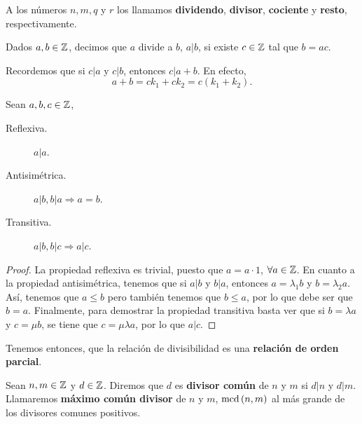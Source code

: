 \begin{observation}
A los números $\displaystyle n, m, q $ y $\displaystyle r $ los llamamos \textbf{dividendo}, \textbf{divisor}, \textbf{cociente} y \textbf{resto}, respectivamente.
\end{observation}
\begin{definition}
Dados $\displaystyle a,b \in \mathbb{Z} $, decimos que $\displaystyle a $ divide a $\displaystyle b $, $\displaystyle a | b $, si existe $\displaystyle c \in \mathbb{Z} $ tal que $\displaystyle b = ac $.
\end{definition}
Recordemos que si $\displaystyle c | a $ y $\displaystyle c | b $, entonces $\displaystyle c | a+b $. En efecto, 
\[a + b = ck_{1} + ck_{2} = c\left(k_{1}+k_{2}\right) .\]
\begin{prop}
	Sean $\displaystyle a,b,c \in \mathbb{Z} $,
\begin{description}
\item[Reflexiva.] $\displaystyle a|a $.
\item[Antisimétrica.] $\displaystyle a|b, b|a \Rightarrow a = b $.
\item[Transitiva.] $\displaystyle a|b, b|c \Rightarrow a|c $.
\end{description}
\end{prop}
\begin{proof}
La propiedad reflexiva es trivial, puesto que $\displaystyle a = a \cdot 1 $, $\displaystyle \forall a \in \mathbb{Z} $. En cuanto a la propiedad antisimétrica, tenemos que si $\displaystyle a|b $ y $\displaystyle b|a $, entonces $\displaystyle a = \lambda_{1} b $ y $\displaystyle b = \lambda_{2}a $. Así, tenemos que $\displaystyle a \leq b $ pero también tenemos que $\displaystyle b \leq a $, por lo que debe ser que $\displaystyle b = a $. Finalmente, para demostrar la propiedad transitiva basta ver que si $\displaystyle b = \lambda a $ y $\displaystyle c = \mu b $, se tiene que $\displaystyle c = \mu \lambda a $, por lo que $\displaystyle a | c $.
\end{proof}
\begin{observation}
Tenemos entonces, que la relación de divisibilidad es una \textbf{relación de orden parcial}.
\end{observation}
\begin{definition}
Sean $\displaystyle n, m \in \mathbb{Z} $ y $\displaystyle d \in \mathbb{Z} $. Diremos que $\displaystyle d $ es \textbf{divisor común} de $\displaystyle n $ y $\displaystyle m $ si $\displaystyle d |n $ y $\displaystyle d|m $. Llamaremos \textbf{máximo común divisor} de $\displaystyle n  $ y $\displaystyle m $, $\displaystyle \text{mcd}\left(n,m\right) $ al más grande de los divisores comunes positivos.
\end{definition}
